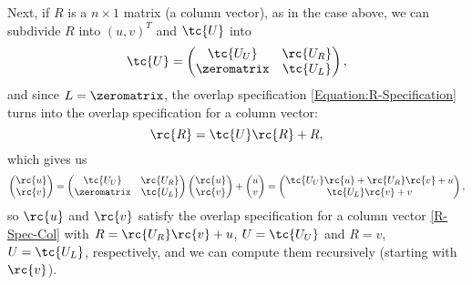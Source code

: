 Next, if $R$ is a $n \times 1$ matrix (a column vector), as in the case above, we can subdivide $R$ into $(u , v)^T$ and $\tc{U}$ into 
\begin{equation*}
  \tc{U} = 
  \begin{pmatrix}
    \tc{U_U} & \rc{U_R} \\
    \zeromatrix   & \tc{U_L}
  \end{pmatrix},
\end{equation*}
and since $L = \zeromatrix$, the overlap specification \eqref{Equation:R-Specification} turns into the overlap specification for a column vector:
\begin{equation}
\label{R-Spec-Col}
\rc{R} = \tc{U}\rc{R} + R,
\end{equation}
which gives us
\begin{equation*}
  \begin{pmatrix}
    \rc{u} \\
    \rc{v}
  \end{pmatrix}
  = \begin{pmatrix}
    \tc{U_U} & \rc{U_R} \\
    \zeromatrix        & \tc{U_L}
  \end{pmatrix}
  \begin{pmatrix}
    \rc{u} \\
    \rc{v}
  \end{pmatrix} 
  + 
  \begin{pmatrix}
    u \\
    v
  \end{pmatrix}
  = 
  \begin{pmatrix}
    \tc{U_U}\rc{u} + \rc{U_R}\rc{v} + u \\
    \tc{U_L}\rc{v} + v
  \end{pmatrix},
\end{equation*}
so $\rc{u}$ and $\rc{v}$ satisfy the overlap specification for a column vector \eqref{R-Spec-Col} with $R = \rc{U_R}\rc{v} + u$, $U = \tc{U_U}$ and $R = v$, $U = \tc{U_L}$, respectively, and we can compute them recursively (starting with $\rc{v}$).

